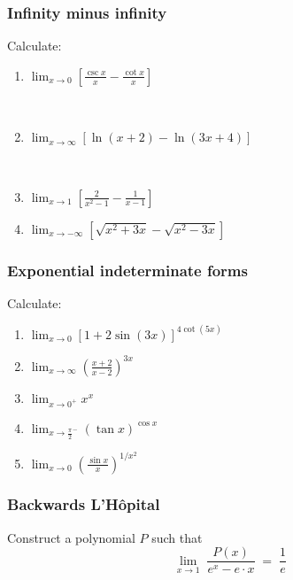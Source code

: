 \begin{frame}[t]
	\frametitle{Infinity minus infinity}

	Calculate:

	\begin{enumerate}
		\item $\displaystyle \lim_{x \to 0}\left[ \frac{\csc x}{x}- \frac{\cot x}{x}\right
			]$

			\

		\item $\displaystyle \lim_{x \to \infty}\left[ \ln (x+2) - \ln(3x+4) \right]$

			\

		\item $\displaystyle \lim_{x \to 1}\left[ \frac{2}{x^{2}-1}- \frac{1}{x-1}\right
			]$

		\item $\displaystyle \lim_{x \to - \infty}\left[ \sqrt{x^{2}+3x}- \sqrt{x^{2}-3x}
			\right]$
	\end{enumerate}
\end{frame}

\begin{frame}[t]
	\frametitle{Exponential indeterminate forms}

	Calculate:

	\begin{enumerate}
		\item $\displaystyle \lim_{x \to 0}\left[ 1 + 2 \sin(3x) \right]^{4 \cot (5x)}$

		\item $\displaystyle \lim_{x \to \infty }\left( \frac{x+2}{x-2}\right)^{3x}$

		\item $\displaystyle \lim_{x \to 0^+}x^{x}$

		\item $\displaystyle \lim_{x \to {\frac{\pi}{2}}^{-}}\left( \tan x \right)^{\cos
			x}$

		\item $\displaystyle \lim_{x \to 0}\left( \frac{\sin x}{x}\right)^{1 /x^2}$
	\end{enumerate}
\end{frame}

\begin{frame}[t]
	\frametitle{Backwards L'H\^{o}pital}

	Construct a polynomial $P$ such that
	\[
		\lim_{x \to 1}\; \frac{P(x)}{e^{x}- e \cdot x}\; = \; \frac{1}{e}
	\]
\end{frame}

